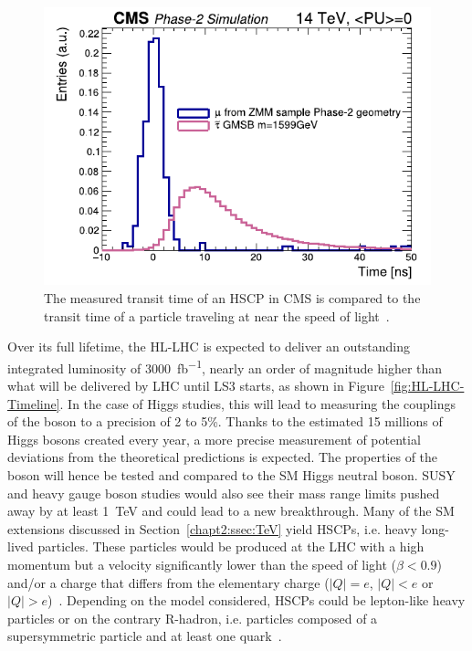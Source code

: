 \begingroup\setlength{\intextsep}{5pt}\setlength{\columnsep}{15pt}
	
	\begin{figure}
		\centering
		\includegraphics[width=\linewidth]{fig/chapt4/HSCP_Time_measurement.pdf}
		\caption{\label{fig:HSCP-Time} The measured transit time of an HSCP in CMS is compared to the transit time of a particle traveling at near the speed of light~\cite{PHASEIITP}.}
	\end{figure}
	
	Over its full lifetime, the HL-LHC is expected to deliver an outstanding integrated luminosity of \SI{3000}{fb^{-1}}, nearly an order of magnitude higher than what will be delivered by LHC until LS3 starts, as shown in Figure~\ref{fig:HL-LHC-Timeline}. In the case of Higgs studies, this will lead to measuring the couplings of the boson to a precision of 2 to 5\%. Thanks to the estimated 15 millions of Higgs bosons created every year, a more precise measurement of potential deviations from the theoretical predictions is expected. The properties of the boson will hence be tested and compared to the SM Higgs neutral boson. SUSY and heavy gauge boson studies would also see their mass range limits pushed away by at least \SI{1}{TeV} and could lead to a new breakthrough. Many of the \acl{SM} extensions discussed in Section~\ref{chapt2:ssec:TeV} yield \acf{HSCPs}, i.e. heavy long-lived particles. These particles would be produced at the LHC with a high momentum but a velocity significantly lower than the speed of light ($\beta < 0.9$)~\cite{DREES1990,FAIRBAIRN2007,LIGETI2010,CMSHSCP2016,KHACHATRYAN2017} and/or a charge that differs from the elementary charge ($\vert Q \vert = e$, $\vert Q \vert < e$ or $\vert Q \vert > e$)~\cite{CMSHSCP2016,KHACHATRYAN2017,KUSENKO1998,KOCH2007,SCHWINGER1966,KHLOPOV2006}. Depending on the model considered, HSCPs could be lepton-like heavy particles or on the contrary R-hadron, i.e. particles composed of a supersymmetric particle and at least one quark~\cite{CMSHSCP2016}.
	
